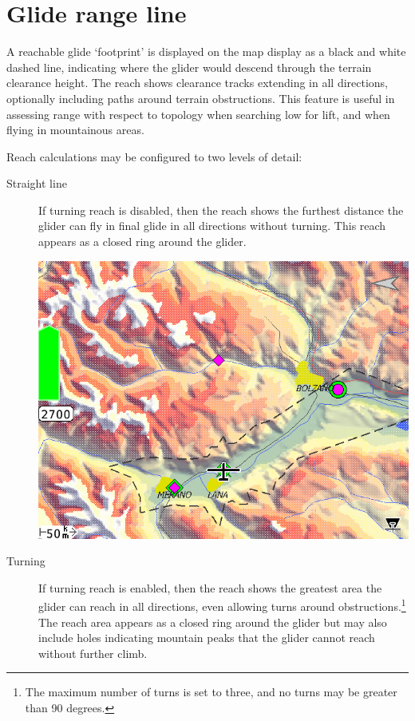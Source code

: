 \section{Glide range line}\label{sec:reach}

A reachable glide `footprint' is displayed on the map display as a
black and white dashed line, indicating where the glider would descend
through the terrain clearance height.  The reach shows clearance
tracks extending in all directions, optionally including paths around
terrain obstructions.  This feature is useful in assessing range with
respect to topology when searching low for lift, and when flying in
mountainous areas.

Reach calculations may be configured  to two levels of detail:
\begin{description}
\item[Straight line] If turning reach is disabled, then the reach shows the
 furthest distance the glider can fly in final glide in all directions without
 turning.  This reach appears as a closed ring around the glider.

\begin{center}
\includegraphics[angle=0,width=1.0\linewidth,keepaspectratio='true']{figures/reach1.png}
\end{center}

\item[Turning] If turning reach is enabled, then the reach shows the
  greatest area the glider can reach in all directions, even allowing
  turns around obstructions.\footnote{The maximum number of turns is
    set to three, and no turns may be greater than 90 degrees.}  The
  reach area appears as a closed ring around the glider but may also
  include holes indicating mountain peaks that the glider cannot reach
  without further climb.


\end{description}
